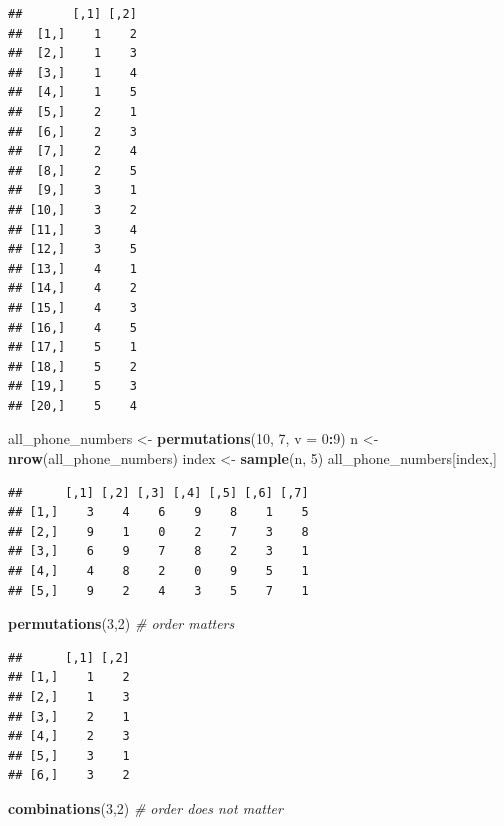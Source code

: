 \documentclass[
]{article}
\newenvironment{Shaded}{\begin{snugshade}}{\end{snugshade}}
\newcommand{\CommentTok}[1]{\textcolor[rgb]{0.56,0.35,0.01}{\textit{#1}}}
\newcommand{\DataTypeTok}[1]{\textcolor[rgb]{0.13,0.29,0.53}{#1}}
\newcommand{\DecValTok}[1]{\textcolor[rgb]{0.00,0.00,0.81}{#1}}
\newcommand{\KeywordTok}[1]{\textcolor[rgb]{0.13,0.29,0.53}{\textbf{#1}}}
\newcommand{\NormalTok}[1]{#1}
\newcommand{\OperatorTok}[1]{\textcolor[rgb]{0.81,0.36,0.00}{\textbf{#1}}}
\newcommand{\StringTok}[1]{\textcolor[rgb]{0.31,0.60,0.02}{#1}}
\begin{document}
\begin{verbatim}
##       [,1] [,2]
##  [1,]    1    2
##  [2,]    1    3
##  [3,]    1    4
##  [4,]    1    5
##  [5,]    2    1
##  [6,]    2    3
##  [7,]    2    4
##  [8,]    2    5
##  [9,]    3    1
## [10,]    3    2
## [11,]    3    4
## [12,]    3    5
## [13,]    4    1
## [14,]    4    2
## [15,]    4    3
## [16,]    4    5
## [17,]    5    1
## [18,]    5    2
## [19,]    5    3
## [20,]    5    4
\end{verbatim}

\begin{Shaded}
\begin{Highlighting}[]
\NormalTok{all\_phone\_numbers \textless{}{-}}\StringTok{ }\KeywordTok{permutations}\NormalTok{(}\DecValTok{10}\NormalTok{, }\DecValTok{7}\NormalTok{, }\DataTypeTok{v =} \DecValTok{0}\OperatorTok{:}\DecValTok{9}\NormalTok{)}
\NormalTok{n \textless{}{-}}\StringTok{ }\KeywordTok{nrow}\NormalTok{(all\_phone\_numbers)}
\NormalTok{index \textless{}{-}}\StringTok{ }\KeywordTok{sample}\NormalTok{(n, }\DecValTok{5}\NormalTok{)}
\NormalTok{all\_phone\_numbers[index,]}
\end{Highlighting}
\end{Shaded}

\begin{verbatim}
##      [,1] [,2] [,3] [,4] [,5] [,6] [,7]
## [1,]    3    4    6    9    8    1    5
## [2,]    9    1    0    2    7    3    8
## [3,]    6    9    7    8    2    3    1
## [4,]    4    8    2    0    9    5    1
## [5,]    9    2    4    3    5    7    1
\end{verbatim}

\begin{Shaded}
\begin{Highlighting}[]
\KeywordTok{permutations}\NormalTok{(}\DecValTok{3}\NormalTok{,}\DecValTok{2}\NormalTok{)    }\CommentTok{\# order matters}
\end{Highlighting}
\end{Shaded}

\begin{verbatim}
##      [,1] [,2]
## [1,]    1    2
## [2,]    1    3
## [3,]    2    1
## [4,]    2    3
## [5,]    3    1
## [6,]    3    2
\end{verbatim}

\begin{Shaded}
\begin{Highlighting}[]
\KeywordTok{combinations}\NormalTok{(}\DecValTok{3}\NormalTok{,}\DecValTok{2}\NormalTok{)    }\CommentTok{\# order does not matter}
\end{Highlighting}
\end{Shaded}
\end{document}
